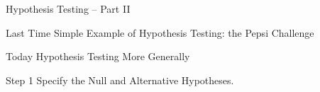 \documentclass[handout]{beamer}
\date{Lecture 21}
\begin{document}
 





\begin{frame}[plain]
	\titlepage 
	

\end{frame} 



\begin{frame}
\begin{center}
	\huge Hypothesis Testing -- Part II
\end{center}
\end{frame}



\begin{frame}
\begin{block}{Last Time}
Simple Example of Hypothesis Testing: the Pepsi Challenge
\end{block}

\begin{block}{Today}
Hypothesis Testing More Generally
\end{block}

\end{frame}
\begin{frame}

\begin{alertblock}{Step 1}
Specify the Null and Alternative Hypotheses.
\end{alertblock}

\end{frame}
\end{document}

